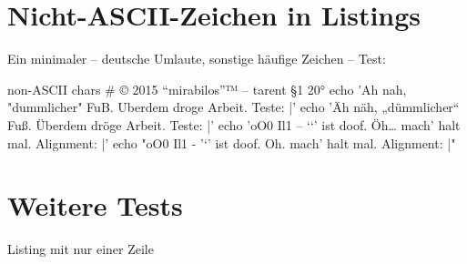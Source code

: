 \documentclass{tarentanleitung}
\begin{document}
\section{Nicht-ASCII-Zeichen in Listings}

\begin{minipage}{\textwidth}
Ein minimaler – deutsche Umlaute, sonstige häufige Zeichen – Test:

\begin{lstdump}[language=sh]{non-ASCII chars}
# © 2015 “mirabilos”™ -- tarent §1 20°
echo 'Ah nah, "dummlicher" FuB. Uberdem droge Arbeit. Teste: |'
echo 'Äh näh, „dümmlicher“ Fuß. Überdem dröge Arbeit. Teste: |'
echo 'oO0 Il1 – ‘`’ ist doof. Öh… mach’ halt mal. Alignment: |'
echo "oO0 Il1 - '`' ist doof. Oh. mach' halt mal. Alignment: |"
\end{lstdump}
\end{minipage}

\section{Weitere Tests}

\begin{lstdumpx}
Listing mit nur einer Zeile
\end{lstdumpx}
\end{document}
